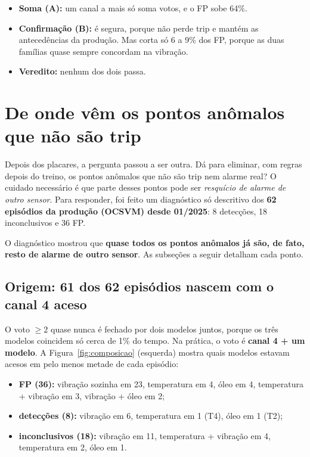 \documentclass[11pt,a4paper]{article}
\begin{document}
\begin{itemize}
  \item \textbf{Soma (A):} um canal a mais só soma votos, e o FP sobe 64\%.
  \item \textbf{Confirmação (B):} é segura, porque não perde trip e mantém as antecedências da produção. Mas corta
        só 6 a 9\% dos FP, porque as duas famílias quase sempre concordam na vibração.
  \item \textbf{Veredito:} nenhum dos dois passa.
\end{itemize}

\section{De onde vêm os pontos anômalos que não são trip}
\label{sec:diagnostico}

Depois dos placares, a pergunta passou a ser outra. Dá para eliminar, com regras depois do treino, os pontos
anômalos que não são trip nem alarme real? O cuidado necessário é que parte desses pontos pode ser \emph{resquício
de alarme de outro sensor}. Para responder, foi feito um diagnóstico só descritivo dos \textbf{62 episódios da
produção (OCSVM) desde 01/2025}: 8 detecções, 18 inconclusivos e 36 FP.

O diagnóstico mostrou que \textbf{quase todos os pontos anômalos já são, de fato, resto de alarme de outro sensor}.
As subseções a seguir detalham cada ponto.

\subsection{Origem: 61 dos 62 episódios nascem com o canal 4 aceso}

O voto $\geq 2$ quase nunca é fechado por dois modelos juntos, porque os três modelos coincidem só cerca de 1\% do
tempo. Na prática, o voto é \textbf{canal 4 + um modelo}. A Figura~\ref{fig:composicao} (esquerda) mostra quais
modelos estavam acesos em pelo menos metade de cada episódio:

\begin{itemize}
  \item \textbf{FP (36):} vibração sozinha em 23, temperatura em 4, óleo em 4, temperatura + vibração em 3, vibração
        + óleo em 2;
  \item \textbf{detecções (8):} vibração em 6, temperatura em 1 (T4), óleo em 1 (T2);
  \item \textbf{inconclusivos (18):} vibração em 11, temperatura + vibração em 4, temperatura em 2, óleo em 1.
\end{itemize}
\end{document}
